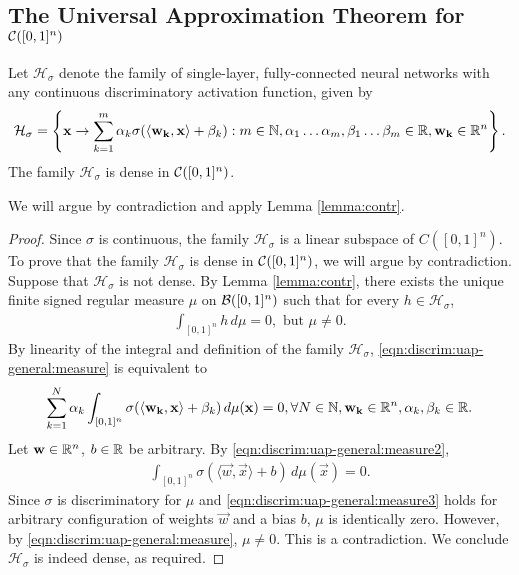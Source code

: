 \newpage
\subsection{The Universal Approximation Theorem for ${\mathcal C}([0,1]^n)$ }
\label{subsection:universality:cybenko:4}
\begin{theorem}
\label{thm:universality:continuousdiscrim}
Let $\mathcal{H}_{\sigma}$ denote the family of single-layer, fully-connected neural networks with any continuous discriminatory activation function, given by \begin{align*}
\mathcal{H}_{\sigma} = \left \{ \mathbf{x} \to \sum_{k=1}^{m} \alpha_k \sigma{\left (\langle \mathbf{w_k}, \mathbf{x} \rangle + \beta_k \right)} : m \in {\mathbb N}, \alpha_1 \ldots \alpha_m, \beta_1 \ldots \beta_m \in {\mathbb R}, \mathbf{w_k} \in {\mathbb R}^n \right \}.
\end{align*}
The family $\mathcal{H}_{\sigma}$ is dense in ${\mathcal C}([0,1]^n)$.
\end{theorem}
\begin{proof-idea*}
We will argue by contradiction and apply Lemma \ref{lemma:contr}.
\end{proof-idea*}
\begin{proof}
Since $\sigma$ is continuous, the family $\mathcal{H}_{\sigma}$ is a linear subspace of $C([0,1]^n)$. To prove that the family $\mathcal{H}_{\sigma}$ is dense in ${\mathcal C}([0,1]^n)$, we will argue by contradiction. Suppose that $\mathcal{H}_{\sigma}$ is not dense. By Lemma \ref{lemma:contr}, there exists the unique finite signed regular measure $\mu$ on ${\mathcal B}([0,1]^n)$ such that for every $ h \in \mathcal{\mathcal{H}_{\sigma}}$, \begin{align}
    \label{eqn:discrim:uap-general:measure}
    \int_{[0,1]^n} h \, d\mu = 0, \text{ but } \mu \neq 0.
\end{align}
By linearity of the integral and definition of the family $\mathcal{H}_{\sigma}$, \ref{eqn:discrim:uap-general:measure} is equivalent to
\begin{align}
    \label{eqn:discrim:uap-general:measure2}
     \sum_{k=1}^{N} \alpha_k \int_{[0,1]^n} \sigma{\left (\langle \mathbf{w_k}, \mathbf{x} \rangle + \beta_k \right)}  \, d\mu(\mathbf{x}) = 0, \forall N \in {\mathbb N}, \mathbf{w_k} \in {\mathbb R}^n, \alpha_k, \beta_k \in {\mathbb R}.
\end{align}
Let $\mathbf{w} \in {\mathbb R}^n$, $b \in {\mathbb R}$ be arbitrary.
By \ref{eqn:discrim:uap-general:measure2}, \begin{align}
    \label{eqn:discrim:uap-general:measure3}
     \int_{[0,1]^n} \sigma{\left (\langle \vec{w}, \vec{x} \rangle + b \right)}  \, d\mu(\vec{x})  = 0.
\end{align}
Since $\sigma$ is discriminatory for $\mu$ and \ref{eqn:discrim:uap-general:measure3} holds for arbitrary configuration of weights $\vec{w}$ and a bias $b$, $\mu$ is identically zero. However, by \ref{eqn:discrim:uap-general:measure}, $\mu \neq 0$. This is a contradiction.
We conclude $\mathcal{H}_{\sigma}$ is indeed dense, as required.
\end{proof}
